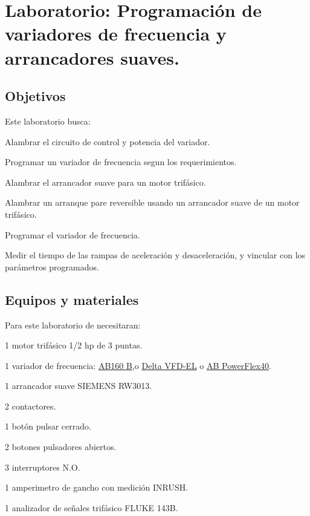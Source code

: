 
  
  \chapter{Laboratorio:  Programación de variadores de frecuencia y arrancadores suaves.}

\section{Objetivos}
Este  laboratorio busca:
\begin{itemize}
	{\small
    \item  Alambrar el circuito de control y potencia del variador.
    \item  Programar un variador de frecuencia segun los requerimientos. 
	 \item Alambrar el arrancador suave para un motor trifásico.
	 \item Alambrar un arranque pare reversible usando un arrancador suave de un motor trifásico.
	 \item Programar el variador de frecuencia.
	 \item Medir el tiempo de las rampas de aceleración y desaceleración, y vincular con los parámetros programados.
 }
\end{itemize} 

 
\section{Equipos y materiales}
Para este laboratorio de necesitaran:
\begin{itemize}
	{\small \item 1 motor trifásico 1/2 hp de 3 puntas.
	\item 1 variador de frecuencia: \href{https://es.scribd.com/doc/275521958/Manual-de-Usuario-Variador-de-Velocidad-Serie-B-Allen-Bradley}{AB160 B},o \href{https://es.scribd.com/document/264717107/Manual-Variador-Delta-VFD-EL}{Delta VFD-EL} o \href{https://www.rockwellautomation.com/search/ra-en-US;keyword=Powerflex%252040;startIndex=0;activeTab=Literature;spellingCorrect=true;facets=;languages=es,en;locales=es_GLOBAL,en_GLOBAL,en-US;sort=bma;isPLS=false;sessionID=754c8ada-9fd8-989f-fc95-a7fb7a9d77bd;deepLinking=false}{AB PowerFlex40}.
	\item 1 arrancador suave SIEMENS RW3013.
	\item 2 contactores.
	\item 1 botón pulsar cerrado.
	\item 2 botones pulsadores abiertos.
	\item 3 interruptores N.O.
	\item 1 amperimetro de gancho con medición INRUSH.
	\item 1 analizador de señales trifásico FLUKE 143B.
}
\end{itemize}

